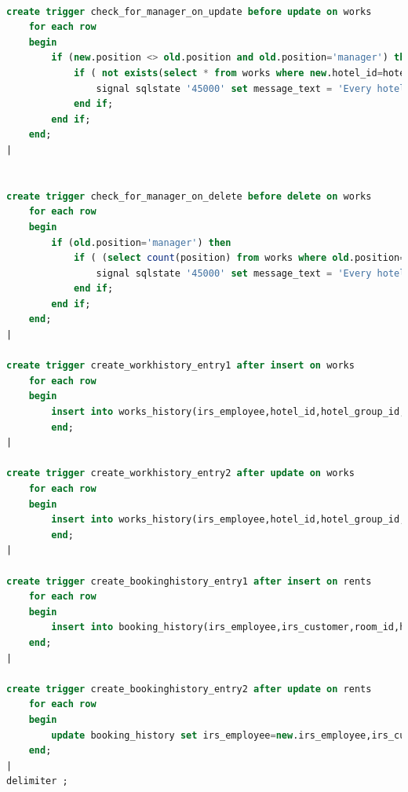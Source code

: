 \documentclass[a4paper,oneside, 11pt]{article}
\begin{document}
\begin{lstlisting}[language=SQL]
	
create trigger check_for_manager_on_update before update on works
	for each row 
	begin
		if (new.position <> old.position and old.position='manager') then 
			if ( not exists(select * from works where new.hotel_id=hotel_id and new.position='manager'and new.finish_date>curdate())) then 
				signal sqlstate '45000' set message_text = 'Every hotel must have a manager';
			end if;
		end if;
	end;
|


create trigger check_for_manager_on_delete before delete on works
	for each row 
	begin
		if (old.position='manager') then
			if ( (select count(position) from works where old.position='manager' and old.finish_date>curdate())>1) then 
				signal sqlstate '45000' set message_text = 'Every hotel must have a manager';
			end if;
		end if;
	end;
|

create trigger create_workhistory_entry1 after insert on works
	for each row
	begin
		insert into works_history(irs_employee,hotel_id,hotel_group_id,position,start_date,finish_date) values (new.irs,new.hotel_id,(select hotel_group_id from hotel where hotel_id=new.hotel_id),new.position,new.start_date,new.finish_date);
        end;
|

create trigger create_workhistory_entry2 after update on works
	for each row
	begin
		insert into works_history(irs_employee,hotel_id,hotel_group_id,position,start_date,finish_date) values (new.irs,new.hotel_id,(select hotel_group_id from hotel where hotel_id=new.hotel_id),new.position,new.start_date,new.finish_date);
        end;
|

create trigger create_bookinghistory_entry1 after insert on rents
	for each row
	begin
		insert into booking_history(irs_employee,irs_customer,room_id,hotel_id,hotel_group_id,start_date,finish_date,payment_method) values (new.irs_employee,new.irs_customer,new.room_id,new.hotel_id,(select hotel_group_id from hotel where hotel_id=new.hotel_id),new.start_date,new.finish_date,new.payment_method);
	end;
|

create trigger create_bookinghistory_entry2 after update on rents
	for each row
	begin
		update booking_history set irs_employee=new.irs_employee,irs_customer=new.irs_customer,room_id=new.room_id,start_date=new.start_date,finish_date=new.finish_date,payment_method=new.payment_method,hotel_id=new.hotel_id,hotel_group_id=(select hotel_group_id from hotel where hotel_id=new.hotel_id);
	end;
|
delimiter ;


\end{lstlisting}
\end{document}
